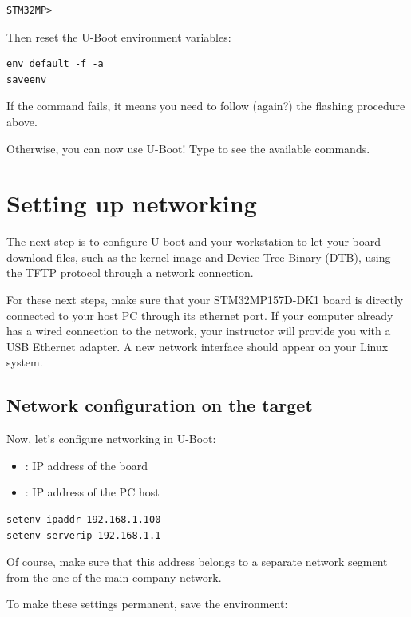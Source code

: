 \begin{verbatim}
STM32MP>
\end{verbatim}

Then reset the U-Boot environment variables:

\begin{verbatim}
env default -f -a
saveenv
\end{verbatim}

If the  command fails, it means you need to follow
(again?) the flashing procedure above.

Otherwise, you can now use U-Boot! Type  to see the available
commands.

\section{Setting up networking}

The next step is to configure U-boot and your workstation to let your
board download files, such as the kernel image and Device Tree Binary
(DTB), using the TFTP protocol through a network connection.

For these next steps, make sure that your STM32MP157D-DK1 board is directly
connected to your host PC through its ethernet port. If your computer already
has a wired connection to the network, your instructor will provide you with
a USB Ethernet adapter. A new network interface should appear on your Linux system.

\subsection{Network configuration on the target}
Now, let's configure networking in U-Boot:

\begin{itemize}
  \item {}: IP address of the board
  \item {}: IP address of the PC host
\end{itemize}

\begin{verbatim}
setenv ipaddr 192.168.1.100
setenv serverip 192.168.1.1
\end{verbatim}

Of course, make sure that this address belongs to a separate network
segment from the one of the main company network.

To make these settings permanent, save the environment:

